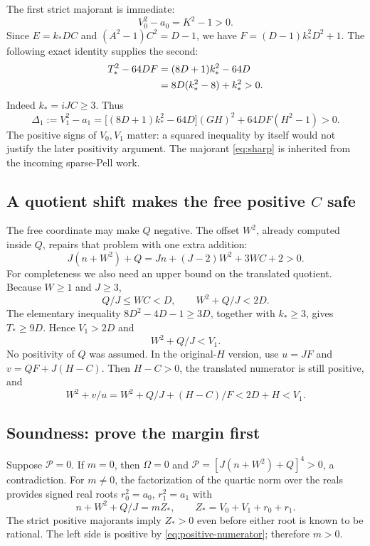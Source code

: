 \documentclass[11pt]{article}
\theoremstyle{remark}\newtheorem{remark}[theorem]{Remark}
\begin{document}
The first strict majorant is immediate:
\begin{equation}\label{eq:maj0}
 V_0^2-a_0=K^2-1>0.
\end{equation}
Since $E=k_*DC$ and $(A^2-1)C^2=D-1$, we have
$F=(D-1)k_*^2D^2+1$. The following exact identity supplies the second:
\begin{align}
 T_*^2-64DF&=(8D+1)k_*^2-64D\notag\\
           &=8D(k_*^2-8)+k_*^2>0.\label{eq:sharp}
\end{align}
Indeed $k_*=iJC\geq3$. Thus
\begin{equation}\label{eq:delta}
 \Delta_1:=V_1^2-a_1
 =\bigl[(8D+1)k_*^2-64D\bigr](GH)^2
                         +64DF(H^2-1)>0.
\end{equation}
The positive signs of $V_0,V_1$ matter: a squared inequality by itself
would not justify the later positivity argument. The majorant
\eqref{eq:sharp} is inherited from the incoming sparse-Pell work.

\subsection{A quotient shift makes the free positive \texorpdfstring{$C$}{C} safe}

The free coordinate may make $Q$ negative. The offset $W^2$, already
computed inside $Q$, repairs that problem with one extra addition:
\begin{equation}\label{eq:positive-numerator}
 J(n+W^2)+Q
   =Jn+(J-2)W^2+3WC+2>0.
\end{equation}
For completeness we also need an upper bound on the translated quotient.
Because $W\geq1$ and $J\geq3$,
\[
 Q/J\leq WC<D,\qquad W^2+Q/J<2D.
\]
The elementary inequality
$8D^2-4D-1\geq3D$, together with $k_*\geq3$, gives
$T_*\geq9D$. Hence $V_1>2D$ and
\begin{equation}\label{eq:quotient-bound}
 W^2+Q/J<V_1.
\end{equation}
No positivity of $Q$ was assumed. In the original-$H$ version, use
$u=JF$ and $v=QF+J(H-C)$. Then $H-C>0$, the translated numerator is
still positive, and
\[
 W^2+v/u=W^2+Q/J+(H-C)/F<2D+H<V_1.
\]

\subsection{Soundness: prove the margin first}

Suppose $\mathcal P=0$. If $m=0$, then $\Omega=0$ and
$\mathcal P=[J(n+W^2)+Q]^4>0$, a contradiction. For $m\ne0$, the
factorization of the quartic norm over the reals provides signed real
roots $r_0^2=a_0$, $r_1^2=a_1$ with
\begin{equation}\label{eq:root-eq}
 n+W^2+Q/J=mZ_*,\qquad Z_*=V_0+V_1+r_0+r_1.
\end{equation}
The strict positive majorants imply $Z_*>0$ even before either root is
known to be rational. The left side is positive by
\eqref{eq:positive-numerator}; therefore $m>0$.
\end{document}
